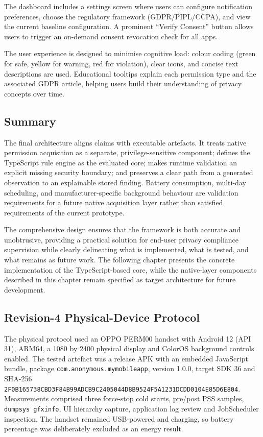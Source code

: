 The dashboard includes a settings screen where users can configure notification preferences, choose the regulatory framework (GDPR/PIPL/CCPA), and view the current baseline configuration. A prominent ``Verify Consent'' button allows users to trigger an on-demand consent revocation check for all apps.

The user experience is designed to minimise cognitive load: colour coding (green for safe, yellow for warning, red for violation), clear icons, and concise text descriptions are used. Educational tooltips explain each permission type and the associated GDPR article, helping users build their understanding of privacy concepts over time.

\subsection{Summary}

The final architecture aligns claims with executable artefacts. It treats native permission acquisition as a separate, privilege-sensitive component; defines the TypeScript rule engine as the evaluated core; makes runtime validation an explicit missing security boundary; and preserves a clear path from a generated observation to an explainable stored finding. Battery consumption, multi-day scheduling, and manufacturer-specific background behaviour are validation requirements for a future native acquisition layer rather than satisfied requirements of the current prototype.

The comprehensive design ensures that the framework is both accurate and unobtrusive, providing a practical solution for end-user privacy compliance supervision while clearly delineating what is implemented, what is tested, and what remains as future work. The following chapter presents the concrete implementation of the TypeScript-based core, while the native-layer components described in this chapter remain specified as target architecture for future development.
\subsection{Revision-4 Physical-Device Protocol}

The physical protocol used an OPPO PERM00 handset with Android 12 (API 31), ARM64, a 1080 by 2400 physical display and ColorOS background controls enabled. The tested artefact was a release APK with an embedded JavaScript bundle, package \texttt{com.anonymous.mymobileapp}, version 1.0.0, target SDK 36 and SHA-256 \texttt{2F0B165738CBD3F84B99ADCB9C2405044D8B9524F5A1231DCDD0104E85D6E804}. Measurements comprised three force-stop cold starts, pre/post PSS samples, \texttt{dumpsys gfxinfo}, UI hierarchy capture, application log review and JobScheduler inspection. The handset remained USB-powered and charging, so battery percentage was deliberately excluded as an energy result.
